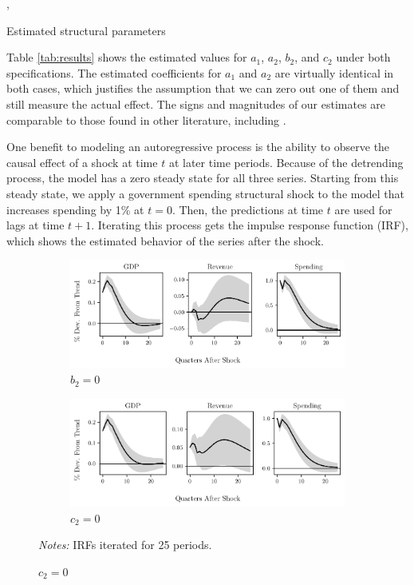 ,\begin{table}[t]
    \centering
    \caption{Estimated structural parameters}
    
    \label{tab:results}
\end{table}

Table \ref{tab:results} shows the estimated values for $a_1$, $a_2$, $b_2$, and $c_2$ under both specifications. The estimated coefficients for $a_1$ and $a_2$ are virtually identical in both cases, which justifies the assumption that we can zero out one of them and still measure the actual effect. The signs and magnitudes of our estimates are comparable to those found in other literature, including \textcite{blanchard2002empirical}.

One benefit to modeling an autoregressive process is the ability to observe the causal effect of a shock at time $t$ at later time periods. Because of the detrending process, the model has a zero steady state for all three series. Starting from this steady state, we apply a government spending structural shock to the model that increases spending by 1\% at $t=0$. Then, the predictions at time $t$ are used for lags at time $t + 1$. Iterating this process gets the impulse response function (IRF), which shows the estimated behavior of the series after the shock.

\begin{figure}[t!]
    \centering
    \caption{Estimated IRFs for a structural government spending shock}
    \begin{subfigure}{\textwidth}
        \includegraphics{figures/b20_irf.pdf}
        \caption{$b_2 = 0$}
    \end{subfigure}

    \begin{subfigure}{\textwidth}
        \includegraphics{figures/c20_irf.pdf}
        \caption{$c_2 = 0$}
    \end{subfigure}

    {\scriptsize \emph{Notes:} IRFs iterated for 25 periods.}
    \label{fig:irfs}
\end{figure}

